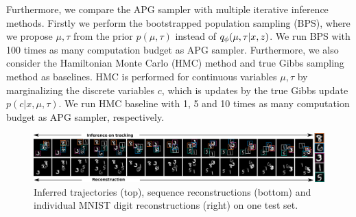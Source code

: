 \documentclass{article}
\theoremstyle{definition}
\begin{document}
Furthermore, we compare the APG sampler with multiple iterative inference methods. Firstly we perform the bootstrapped population sampling (BPS), where we propose $\mu, \tau$ from the prior $p(\mu, \tau)$ instead of $q_\phi(\mu, \tau | x, z)$. We run BPS with 100 times as many computation budget as APG sampler. Furthermore, we also consider the Hamiltonian Monte Carlo (HMC) method and true Gibbs sampling method as baselines. HMC is performed for continuous variables $\mu, \tau$ by marginalizing the discrete variables $c$, which is updates by the true Gibbs update $p(c | x, \mu, \tau)$. We run HMC baseline with 1, 5 and 10 times as many computation budget as APG sampler, respectively.
\begin{figure}[!h]
  \centering
  \includegraphics[width=1.0\textwidth]{figures/bmnist-5digits-samples.pdf}
  \caption{Inferred trajectories (top), sequence reconstructions (bottom) and individual MNIST digit reconstructions (right) on one test set.}
  \label{mnist-qualitative}
\end{figure}
\end{document}
